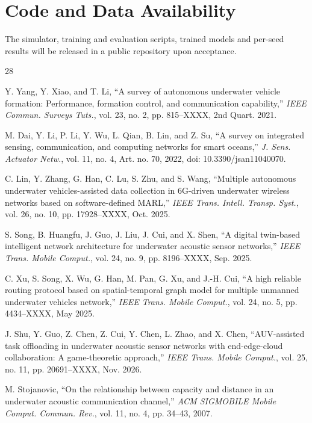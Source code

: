 \documentclass[lettersize,journal]{IEEEtran}
\begin{document}
\section*{Code and Data Availability}
The simulator, training and evaluation scripts, trained models and per-seed results will be released in a public repository upon acceptance.

\begin{thebibliography}{28}

Y. Yang, Y. Xiao, and T. Li, ``A survey of autonomous underwater vehicle formation: Performance, formation control, and communication capability,'' \textit{IEEE Commun. Surveys Tuts.}, vol. 23, no. 2, pp. 815--XXXX, 2nd Quart. 2021.

M. Dai, Y. Li, P. Li, Y. Wu, L. Qian, B. Lin, and Z. Su, ``A survey on integrated sensing, communication, and computing networks for smart oceans,'' \textit{J. Sens. Actuator Netw.}, vol. 11, no. 4, Art. no. 70, 2022, doi: 10.3390/jsan11040070.

C. Lin, Y. Zhang, G. Han, C. Lu, S. Zhu, and S. Wang, ``Multiple autonomous underwater vehicles-assisted data collection in 6G-driven underwater wireless networks based on software-defined MARL,'' \textit{IEEE Trans. Intell. Transp. Syst.}, vol. 26, no. 10, pp. 17928--XXXX, Oct. 2025.

S. Song, B. Huangfu, J. Guo, J. Liu, J. Cui, and X. Shen, ``A digital twin-based intelligent network architecture for underwater acoustic sensor networks,'' \textit{IEEE Trans. Mobile Comput.}, vol. 24, no. 9, pp. 8196--XXXX, Sep. 2025.

C. Xu, S. Song, X. Wu, G. Han, M. Pan, G. Xu, and J.-H. Cui, ``A high reliable routing protocol based on spatial-temporal graph model for multiple unmanned underwater vehicles network,'' \textit{IEEE Trans. Mobile Comput.}, vol. 24, no. 5, pp. 4434--XXXX, May 2025.

J. Shu, Y. Guo, Z. Chen, Z. Cui, Y. Chen, L. Zhao, and X. Chen, ``AUV-assisted task offloading in underwater acoustic sensor networks with end-edge-cloud collaboration: A game-theoretic approach,'' \textit{IEEE Trans. Mobile Comput.}, vol. 25, no. 11, pp. 20691--XXXX, Nov. 2026.

M. Stojanovic, ``On the relationship between capacity and distance in an underwater acoustic communication channel,'' \textit{ACM SIGMOBILE Mobile Comput. Commun. Rev.}, vol. 11, no. 4, pp. 34--43, 2007.


\end{thebibliography}
\end{document}
